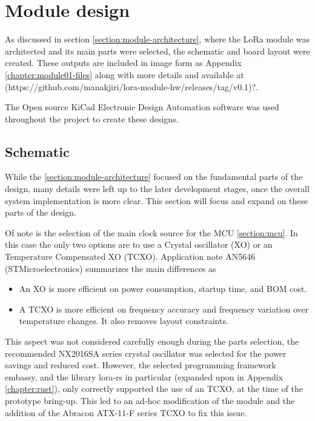
\section{Module design}
As discussed in section \ref{section:module-architecture}, where the LoRa module was architected and its main parts were selected, the schematic and board layout were created. These outputs are included in image form as Appendix \ref{chapter:module01-files} along with more details and available at (https://github.com/manakjiri/lora-module-hw/releases/tag/v0.1)?.

The Open source KiCad Electronic Design Automation software was used throughout the project to create these designs. 

\subsection{Schematic}
While the \ref{section:module-architecture} focused on the fundamental parts of the design, many details were left up to the later development stages, once the overall system implementation is more clear. This section will focus and expand on these parts of the design.

Of note is the selection of the main clock source for the MCU \ref{section:mcu}. In this case the only two options are to use a Crystal oscillator (XO) or an Temperature Compensated XO (TCXO). Application note AN5646 (STMicroelectronics) summarizes the main differences as
\begin{itemize}
    \item An XO is more efficient on power consumption, startup time, and BOM cost.
    \item A TCXO is more efficient on frequency accuracy and frequency variation over temperature changes. It also
    removes layout constraints.
\end{itemize}

This aspect was not considered carefully enough during the parts selection, the recommended NX2016SA series crystal oscillator was selected for the power savings and reduced cost. However, the selected programming framework embassy, and the library lora-rs in particular (expanded upon in Appendix \ref{chapter:rust}), only correctly supported the use of an TCXO, at the time of the prototype bring-up. This led to an ad-hoc modification of the module and the addition of the Abracon ATX-11-F series TCXO to fix this issue.

